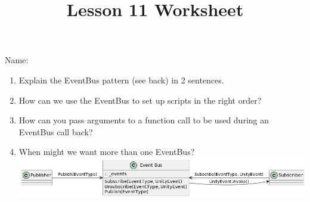 \documentclass[12pt]{../rhitcsse}
\title{Lesson 11 Worksheet}
\begin{document}
\maketitle

\vspace*{0.15in}\hspace{0.25in}Name:\hrulefill\hspace{0.25in}\hspace{0.25in}

\begin{enumerate}
  \item Explain the EventBus pattern (see back) in 2 sentences.
  \vfill
  \item How can we use the EventBus to set up scripts in the right order?
  \vfill
  \item How can you pass arguments to a function call to be used during an EventBus call back?
  \vfill
  \item When might we want more than one EventBus?
  \vfill
  \clearpage
  \centering
  \includegraphics[width=\textwidth]{../figs/EventBus.png}

\end{enumerate}
\end{document}
